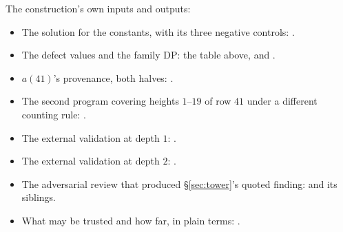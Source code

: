 \documentclass[11pt]{article}
\begin{document}

The construction's own inputs and outputs:


\begin{itemize}
\item The solution for the constants, with its three negative controls:
.
\item The defect values and the family DP: the table above, and
.
\item $a(41)$'s provenance, both halves: .
\item The second program covering heights $1$--$19$ of row $41$ under a
different counting rule: .
\item The external validation at depth $1$:
.
\item The external validation at depth $2$:
.
\item The adversarial review that produced \S\ref{sec:tower}'s quoted
finding:  and its siblings.
\item What may be trusted and how far, in plain terms:
.
\end{itemize}



\end{document}
